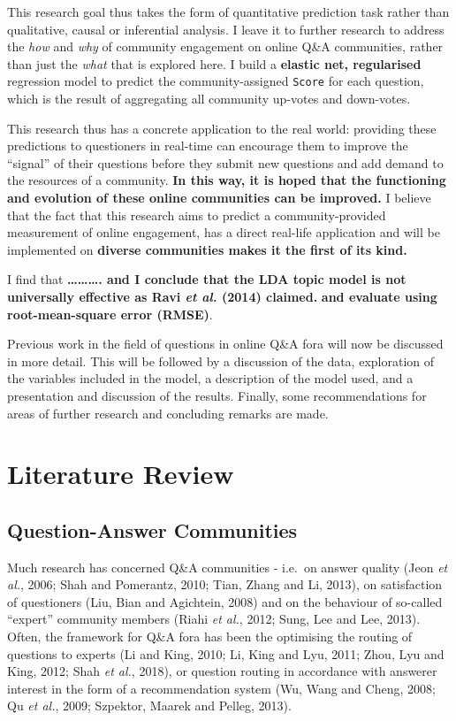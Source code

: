 \documentclass[11pt,preprint, authoryear]{article}
\numberwithin{equation}{section}
\begin{document}
This research goal thus takes the form of quantitative prediction task
rather than qualitative, causal or inferential analysis. I leave it to
further research to address the \emph{how} and \emph{why} of community
engagement on online Q\&A communities, rather than just the \emph{what}
that is explored here. I build a \textbf{elastic net, regularised}
regression model to predict the community-assigned \texttt{Score} for
each question, which is the result of aggregating all community up-votes
and down-votes.

This research thus has a concrete application to the real world:
providing these predictions to questioners in real-time can encourage
them to improve the ``signal'' of their questions before they submit new
questions and add demand to the resources of a community. \textbf{In
this way, it is hoped that the functioning and evolution of these online
communities can be improved.} I believe that the fact that this research
aims to predict a community-provided measurement of online engagement,
has a direct real-life application and will be implemented on
\textbf{diverse communities makes it the first of its kind.}

I find that \textbf{\ldots{}\ldots{}\ldots{}. and I conclude that the
LDA topic model is not universally effective as Ravi \emph{et al.}
(2014) claimed.} \textbf{and evaluate using root-mean-square error
(RMSE)}.

Previous work in the field of questions in online Q\&A fora will now be
discussed in more detail. This will be followed by a discussion of the
data, exploration of the variables included in the model, a description
of the model used, and a presentation and discussion of the results.
Finally, some recommendations for areas of further research and
concluding remarks are made.

\newpage

\section{\texorpdfstring{Literature Review
\label{Lit}}{Literature Review }}\label{literature-review}

\subsection{Question-Answer
Communities}\label{question-answer-communities}

Much research has concerned Q\&A communities - i.e.~on answer quality
(Jeon \emph{et al.}, 2006; Shah and Pomerantz, 2010; Tian, Zhang and Li,
2013), on satisfaction of questioners (Liu, Bian and Agichtein, 2008)
and on the behaviour of so-called ``expert'' community members (Riahi
\emph{et al.}, 2012; Sung, Lee and Lee, 2013). Often, the framework for
Q\&A fora has been the optimising the routing of questions to experts
(Li and King, 2010; Li, King and Lyu, 2011; Zhou, Lyu and King, 2012;
Shah \emph{et al.}, 2018), or question routing in accordance with
answerer interest in the form of a recommendation system (Wu, Wang and
Cheng, 2008; Qu \emph{et al.}, 2009; Szpektor, Maarek and Pelleg, 2013).
\end{document}
